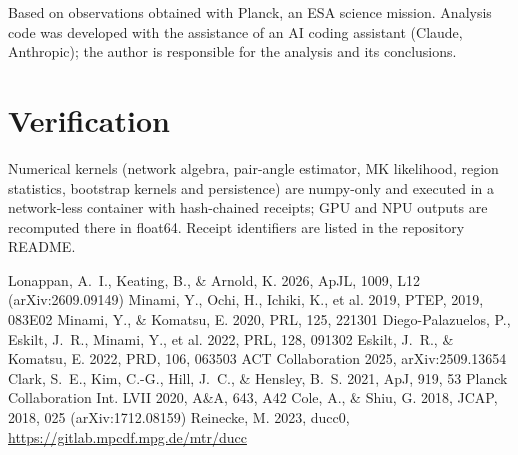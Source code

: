 \documentclass[twocolumn]{aastex631}
\begin{document}
\begin{acknowledgments}
Based on observations obtained with Planck, an ESA science mission. Analysis code was developed
with the assistance of an AI coding assistant (Claude, Anthropic); the author is responsible for
the analysis and its conclusions.
\end{acknowledgments}

\appendix
\section{Verification}\label{app:vv}
Numerical kernels (network algebra, pair-angle estimator, MK likelihood, region statistics,
bootstrap kernels and persistence) are numpy-only and executed in a network-less container with
hash-chained receipts; GPU and NPU outputs are recomputed there in float64. Receipt identifiers are
listed in the repository README.

\begin{thebibliography}{}
 Lonappan, A.~I., Keating, B., \& Arnold, K. 2026, ApJL, 1009, L12 (arXiv:2609.09149)
 Minami, Y., Ochi, H., Ichiki, K., et al. 2019, PTEP, 2019, 083E02
 Minami, Y., \& Komatsu, E. 2020, PRL, 125, 221301
 Diego-Palazuelos, P., Eskilt, J.~R., Minami, Y., et al. 2022, PRL, 128, 091302
 Eskilt, J.~R., \& Komatsu, E. 2022, PRD, 106, 063503
 ACT Collaboration 2025, arXiv:2509.13654
 Clark, S.~E., Kim, C.-G., Hill, J.~C., \& Hensley, B.~S. 2021, ApJ, 919, 53
 Planck Collaboration Int. LVII 2020, A\&A, 643, A42
 Cole, A., \& Shiu, G. 2018, JCAP, 2018, 025 (arXiv:1712.08159)
 Reinecke, M. 2023, ducc0, \url{https://gitlab.mpcdf.mpg.de/mtr/ducc}
\end{thebibliography}
\end{document}
